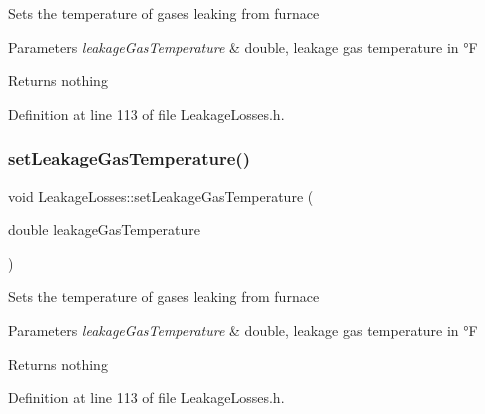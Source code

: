 Sets the temperature of gases leaking from furnace


\begin{DoxyParams}{Parameters}
{\em leakage\+Gas\+Temperature} & double, leakage gas temperature in °F\\
\hline
\end{DoxyParams}
\begin{DoxyReturn}{Returns}
nothing 
\end{DoxyReturn}


Definition at line 113 of file Leakage\+Losses.\+h.

\mbox{\label{class_leakage_losses_a379c88c8dea822636a1b9966e2408daa}} 
\subsubsection{\texorpdfstring{set\+Leakage\+Gas\+Temperature()}{setLeakageGasTemperature()}\hspace{0.1cm}{\footnotesize\ttfamily [2/3]}}
{\footnotesize\ttfamily void Leakage\+Losses\+::set\+Leakage\+Gas\+Temperature (\begin{DoxyParamCaption}\item[{double}]{leakage\+Gas\+Temperature }\end{DoxyParamCaption})\hspace{0.3cm}{\ttfamily [inline]}}

Sets the temperature of gases leaking from furnace


\begin{DoxyParams}{Parameters}
{\em leakage\+Gas\+Temperature} & double, leakage gas temperature in °F\\
\hline
\end{DoxyParams}
\begin{DoxyReturn}{Returns}
nothing 
\end{DoxyReturn}


Definition at line 113 of file Leakage\+Losses.\+h.

\mbox{\label{class_leakage_losses_a379c88c8dea822636a1b9966e2408daa}} 
